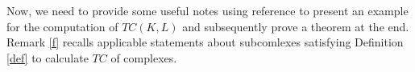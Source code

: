 \documentclass[preprint,11pt %
]{hjm1}
\theoremstyle{definition}
\begin{document}
%
%


Now, we need to provide some useful notes using reference \cite{dis} to present an example for the computation of \( TC(K, L) \) and subsequently prove a theorem at the end.
Remark \ref{f} recalls applicable statements about subcomlexes satisfying Definition \ref{def} to calculate $TC$ of complexes.
\end{document}
